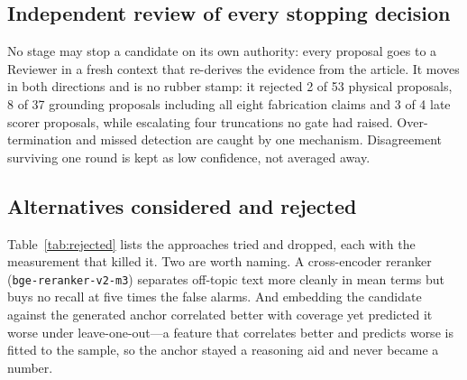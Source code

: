 \documentclass[conference]{IEEEtran}
\begin{document}
\subsection{Independent review of every stopping decision}
No stage may stop a candidate on its own authority: every proposal goes to
a Reviewer in a fresh context that re-derives the evidence from the
article. It moves in both directions and is no rubber stamp: it rejected 2 of 53
physical proposals, 8 of 37 grounding proposals including all eight
fabrication claims and 3 of 4 late scorer proposals, while escalating four
truncations no gate had raised. Over-termination and missed detection are caught
by one mechanism. Disagreement surviving one round is kept
as low confidence, not averaged away.


\subsection{Alternatives considered and rejected}
Table~\ref{tab:rejected} lists the approaches tried and dropped, each with
the measurement that killed it. Two are worth naming. A cross-encoder
reranker (\texttt{bge-reranker-v2-m3}) separates off-topic text more
cleanly in mean terms but buys no recall at five times the false alarms.
And embedding the candidate against the generated anchor correlated better
with coverage yet predicted it worse under leave-one-out---a feature that
correlates better and predicts worse is fitted to the sample, so the
anchor stayed a reasoning aid and never became a number.

\vspace{-0.5cm}
\end{document}
